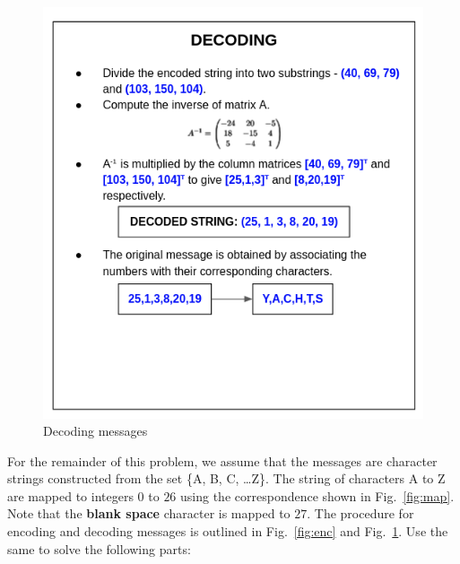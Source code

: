 \documentclass[titlepage, 11pt]{article}
\begin{document}
\begin{figure}[H]
    \centering
    \includegraphics[scale = 0.55]{dec.png}
    \caption{Decoding messages}
    \label{fig:dec}
\end{figure}

\noindent For the remainder of this problem, we assume that the messages are character strings constructed from the set \{A, B, C, \ldots Z\}. The string of characters A to Z are mapped to integers $0$ to $26$ using the correspondence shown in Fig.~\ref{fig:map}. Note that the \textbf{blank space} character is mapped to \textbf{$27$}. The procedure for encoding and decoding messages is outlined in Fig.~\ref{fig:enc} and Fig.~\ref{fig:dec}. Use the same to solve the following parts:
\end{document}

